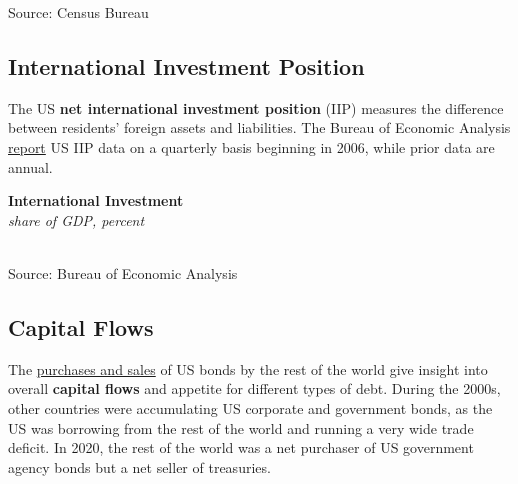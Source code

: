 \documentclass{report}
\makeatletter
\newcommand{\tbllink}[1]{\href{https://raw.githubusercontent.com/bdecon/US-chartbook/master/chartbook/data/#1}{\faTable}}
\newcommand*\short[1]{\expandafter\@gobbletwo\number\numexpr#1\relax}
\newcommand{\dateaxisticks}{
		date coordinates in=x, axis line style={draw=none},
		xmax={2023-10-01},
		max space between ticks=40,	    
		xtick={{1990-01-01}, {1992-01-01}, {1994-01-01}, 
			{1996-01-01}, {1998-01-01}, {2000-01-01}, 
			{2002-01-01}, {2004-01-01}, {2006-01-01},
			{2008-01-01}, {2010-01-01}, {2012-01-01}, {2014-01-01},
		    {2016-01-01}, {2018-01-01}, {2020-01-01}, {2022-01-01}, 
		    {2024-01-01}, {2026-01-01}},
		minor xtick={{1989-01-01}, {1991-01-01}, {1993-01-01},
			{1995-01-01}, {1997-01-01}, {1999-01-01}, 
			{2001-01-01}, {2003-01-01}, {2005-01-01}, {2007-01-01},
		    {2009-01-01}, {2011-01-01}, {2013-01-01}, {2015-01-01},
		    {2017-01-01}, {2019-01-01}, {2021-01-01}, {2023-01-01}, 
		    {2025-01-01}, {2027-01-01}},
		enlarge y limits={0.06}, enlarge x limits={0.01},
		}
\newcommand{\bbar}[2]{extra #1 ticks = {{#2}}, extra #1 tick labels = ,
		extra #1 tick style = {grid=major, grid style={thick, black!25}},}
\newcommand{\rbars}{
		\fill[color=black!10] (axis cs:{1990-07-01},\pgfkeysvalueof{/pgfplots/ymin}) rectangle 
			(axis cs:{1991-03-01}, \pgfkeysvalueof{/pgfplots/ymax});
		\fill[color=black!10] (axis cs:{2007-12-01},\pgfkeysvalueof{/pgfplots/ymin}) rectangle 
			(axis cs:{2009-07-01}, \pgfkeysvalueof{/pgfplots/ymax});
		\fill[color=black!10] (axis cs:{2001-03-01},\pgfkeysvalueof{/pgfplots/ymin}) rectangle 
			(axis cs:{2001-11-01}, \pgfkeysvalueof{/pgfplots/ymax});
		\fill[color=black!10] (axis cs:{2020-02-01},\pgfkeysvalueof{/pgfplots/ymin}) rectangle 
			(axis cs:{2020-05-01}, \pgfkeysvalueof{/pgfplots/ymax});}
\makeatother
\begin{document}
{\begin{minipage}{0.76\textwidth}
\footnotesize{Source: Census Bureau}
\end{minipage}
\newpage
\hypertarget{exiip}{\label{exiip}}
\begin{minipage}{0.76\textwidth}
\subsection*{International Investment Position}
\vspace{-0.5mm}
\small The US \textbf{net international investment position} (IIP) measures the difference between residents' foreign assets and liabilities. The Bureau of Economic Analysis \href{https://www.bea.gov/data/intl-trade-investment/international-investment-position}{report} US IIP data on a quarterly basis beginning in 2006, while prior data are annual. 


\vspace{1mm}

\normalsize \textbf{International Investment}\\
\footnotesize{\textit{share of GDP, percent}}\\
\hspace*{-2mm} \\
\footnotesize{Source: Bureau of Economic Analysis} \hfill \tbllink{iip.csv}
\end{minipage}
\newpage
\hypertarget{excf}{\label{excf}}
\begin{minipage}{0.76\textwidth}
\subsection*{Capital Flows}
\vspace{-0.5mm}
\small The \href{https://home.treasury.gov/data/treasury-international-capital-tic-system}{purchases and sales} of US bonds by the rest of the world give insight into overall \textbf{capital flows} and appetite for different types of debt. During the 2000s, other countries were accumulating US corporate and government bonds, as the US was borrowing from the rest of the world and running a very wide trade deficit. In 2020, the rest of the world was a net purchaser of US government agency bonds but a net seller of treasuries. 


\end{minipage}}
\end{document}

